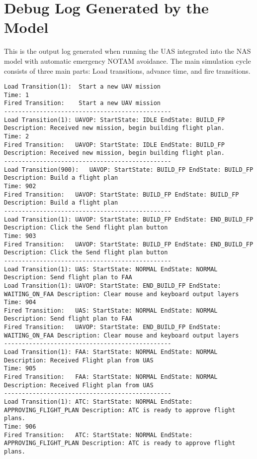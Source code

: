 \chapter{Debug Log Generated by the Model}

This is the output log generated when running the UAS integrated into the NAS model with automatic emergency NOTAM avoidance.  The main simulation cycle consists of three main parts: Load transitions, advance time, and fire transitions.


\begin{spacing}{1}
\tiny
\begin{verbatim}
Load Transition(1):	 Start a new UAV mission
Time: 1
Fired Transition:	 Start a new UAV mission
-----------------------------------------------
Load Transition(1):	UAVOP: StartState: IDLE EndState: BUILD_FP Description: Received new mission, begin building flight plan.
Time: 2
Fired Transition:	UAVOP: StartState: IDLE EndState: BUILD_FP Description: Received new mission, begin building flight plan.
-----------------------------------------------
Load Transition(900):	UAVOP: StartState: BUILD_FP EndState: BUILD_FP Description: Build a flight plan
Time: 902
Fired Transition:	UAVOP: StartState: BUILD_FP EndState: BUILD_FP Description: Build a flight plan
-----------------------------------------------
Load Transition(1):	UAVOP: StartState: BUILD_FP EndState: END_BUILD_FP Description: Click the Send flight plan button
Time: 903
Fired Transition:	UAVOP: StartState: BUILD_FP EndState: END_BUILD_FP Description: Click the Send flight plan button
-----------------------------------------------
Load Transition(1):	UAS: StartState: NORMAL EndState: NORMAL Description: Send flight plan to FAA
Load Transition(1):	UAVOP: StartState: END_BUILD_FP EndState: WAITING_ON_FAA Description: Clear mouse and keyboard output layers
Time: 904
Fired Transition:	UAS: StartState: NORMAL EndState: NORMAL Description: Send flight plan to FAA
Fired Transition:	UAVOP: StartState: END_BUILD_FP EndState: WAITING_ON_FAA Description: Clear mouse and keyboard output layers
-----------------------------------------------
Load Transition(1):	FAA: StartState: NORMAL EndState: NORMAL Description: Received Flight plan from UAS
Time: 905
Fired Transition:	FAA: StartState: NORMAL EndState: NORMAL Description: Received Flight plan from UAS
-----------------------------------------------
Load Transition(1):	ATC: StartState: NORMAL EndState: APPROVING_FLIGHT_PLAN Description: ATC is ready to approve flight plans.
Time: 906
Fired Transition:	ATC: StartState: NORMAL EndState: APPROVING_FLIGHT_PLAN Description: ATC is ready to approve flight plans.

\end{verbatim}
\end{spacing}
